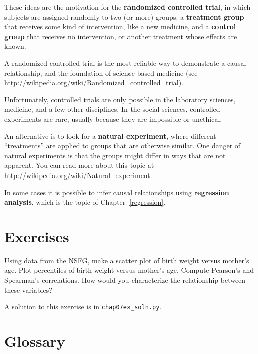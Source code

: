 \documentclass[12pt]{book}
\begin{document}
These ideas are the motivation for the {\bf randomized controlled
trial}, in which subjects are assigned randomly to two (or more)
groups: a {\bf treatment group} that receives some kind of intervention,
like a new medicine, and a {\bf control group} that receives
no intervention, or another treatment whose effects are known.

A randomized controlled trial is the most reliable way to demonstrate
a causal relationship, and the foundation of science-based medicine
(see \url{http://wikipedia.org/wiki/Randomized_controlled_trial}).

Unfortunately, controlled trials are only possible in the laboratory
sciences, medicine, and a few other disciplines.  In the social sciences,
controlled experiments are rare, usually because they are impossible
or unethical.

An alternative is to look for a {\bf natural experiment}, where
different ``treatments'' are applied to groups that are otherwise
similar.  One danger of natural experiments is that the groups might
differ in ways that are not apparent.  You can read more about this
topic at \url{http://wikipedia.org/wiki/Natural_experiment}.

In some cases it is possible to infer causal relationships using {\bf
  regression analysis}, which is the topic of Chapter~\ref{regression}.


\section{Exercises}

\begin{exercise}
Using data from the NSFG, make a scatter plot of birth weight
versus mother's age.  Plot percentiles of birth weight
versus mother's age.  Compute Pearson's and Spearman's correlations.
How would you characterize the relationship
between these variables?

A solution to this exercise is in \verb"chap07ex_soln.py".
\end{exercise}


\section{Glossary}
\end{document}
